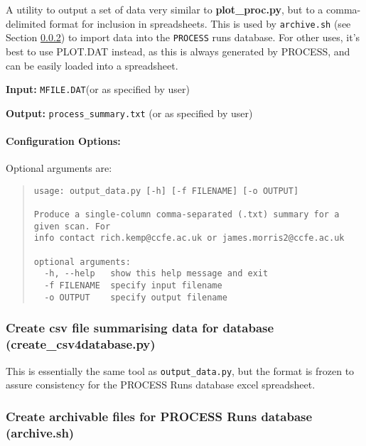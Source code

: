 \documentclass[11pt,a4paper]{article}
\newcommand{\mfile}{\mbox{\texttt{MFILE.DAT}}}
\newcommand{\process}{\mbox{\texttt{PROCESS}}}
\begin{document}
A utility to output a set of data very similar to {\bf plot\_proc.py}, but to a comma-delimited format for inclusion in spreadsheets. This is used by \texttt{archive.sh} (see Section \ref{ssec:archive}) to import data into the \process\/ runs database. For other uses, it's best to use PLOT.DAT instead, as this is always generated by PROCESS, and can be easily loaded into a spreadsheet.
\begin{description}
\item{\textbf{Input:}}
 \mfile (or as specified by user)

\item{\textbf{Output:}}
\verb|process_summary.txt| (or as specified by user)
\end{description}

\paragraph{Configuration Options:}

Optional arguments are:
\begin{quote}
\begin{verbatim}
usage: output_data.py [-h] [-f FILENAME] [-o OUTPUT]

Produce a single-column comma-separated (.txt) summary for a given scan. For
info contact rich.kemp@ccfe.ac.uk or james.morris2@ccfe.ac.uk

optional arguments:
  -h, --help   show this help message and exit
  -f FILENAME  specify input filename
  -o OUTPUT    specify output filename
\end{verbatim}
\end{quote}

\subsubsection{Create csv file summarising data for database (create\_csv4database.py)}

This is essentially the same tool as \texttt{output\_data.py}, but the format is frozen to assure consistency for the PROCESS Runs database excel spreadsheet.


\subsubsection{Create archivable files for PROCESS Runs database (archive.sh)}
\label{ssec:archive}
\end{document}
